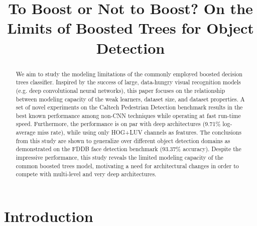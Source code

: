 \documentclass[a4paper,conference]{IEEEtran_icpr}
\begin{document}
\def\SP#1{\textsuperscript{#1}}
\def\SB#1{\textsubscript{#1}}
\def\SPSB#1#2{\rlap{\textsuperscript{#1}}\textsubscript{#2}}

\providecommand{\e}[1]{\ensuremath{\times 10^{#1}}}

\title{To Boost or Not to Boost? On the Limits of Boosted Trees for Object Detection}



\author{
}




\maketitle

\begin{abstract}
We aim to study the modeling limitations of the commonly employed boosted decision trees classifier. Inspired by the success of large, data-hungry visual recognition models (e.g. deep convolutional neural networks), this paper focuses on the relationship between modeling capacity of the weak learners, dataset size, and dataset properties. A set of novel experiments on the Caltech Pedestrian Detection benchmark results in the best known performance among non-CNN techniques while operating at fast run-time speed. Furthermore, the performance is on par with deep architectures (9.71\% log-average miss rate), while using only HOG+LUV channels as features. The conclusions from this study are shown to generalize over different object detection domains as demonstrated on the FDDB face detection benchmark (93.37\% accuracy). Despite the impressive performance, this study reveals the limited modeling capacity of the common boosted trees model, motivating a need for architectural changes in order to compete with multi-level and very deep architectures. 
\end{abstract}

\IEEEpeerreviewmaketitle

\section{Introduction}
\label{sec:intro}
\end{document}
